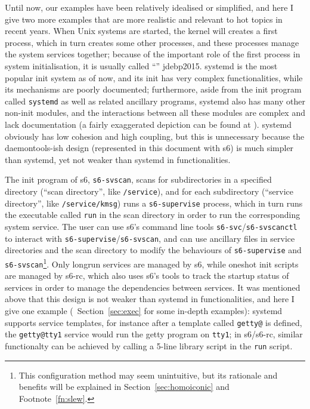 Until now, our examples have been relatively idealised or simplified, and here
I give two more examples that are more realistic and relevant to hot topics in
recent years.  When Unix systems are started, the kernel will creates a first
process, which in turn creates some other processes, and these processes manage
the system services together; because of the important role of the first process
in system initialisation, it is usually called ``''\cupercite%
{jdebp2015}.  systemd is the most popular init system as of now, and its init
has very complex functionalities, while its mechanisms are poorly documented;
furthermore, aside from the init program called \verb|systemd| as well as
related ancillary programs, systemd also has many other non-init modules, and
the interactions between all these modules are complex and lack documentation
(a fairly exaggerated depiction can be found at \parencite{litt2014b}).
systemd obviously has low cohesion and high coupling, but this is unnecessary
because the daemontools-ish design (represented in this document with s6) is
much simpler than systemd, yet not weaker than systemd in functionalities.

The init program of s6, \verb|s6-svscan|, scans for subdirectories in a
specified directory (``scan directory'', like \verb|/service|), and for each
subdirectory (``service directory'', like \verb|/service/kmsg|) runs a
\verb|s6-supervise| process, which in turn runs the executable called \verb|run|
in the scan directory in order to run the corresponding system service.
The user can use s6's command line tools \verb|s6-svc|/\verb|s6-svscanctl|
to interact with \verb|s6-supervise|/\verb|s6-svscan|, and can use ancillary
files in service directories and the scan directory to modify the behaviours
of \verb|s6-supervise| and \verb|s6-svscan|\footnote{This configuration method
may seem unintuitive, but its rationale and benefits will be explained in
Section~\ref{sec:homoiconic} and Footnote~\ref{fn:slew}.}.  Only longrun
services are managed by s6, while oneshot init scripts are managed by s6-rc,
which also uses s6's tools to track the startup status of services in order to
manage the dependencies between services.  It was mentioned above that this
design is not weaker than systemd in functionalities, and here I give one
example (\cf~Section~\ref{sec:exec} for some in-depth examples): systemd
supports service templates, for instance after a template called \verb|getty@|
is defined, the \verb|getty@tty1| service would run the getty program on
\verb|tty1|; in s6/s6-rc, similar functionalty can be achieved by calling
a 5-line library script in the \verb|run| script.

